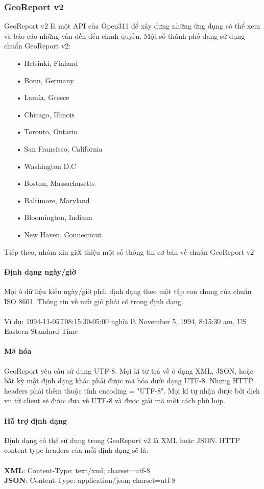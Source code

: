 \documentclass[a4paper]{article}
\begin{document}
\subsubsection{GeoReport v2}
GeoReport v2 là một API của Open311 để xây dựng những ứng dụng có thể xem và báo cáo những vấn đền đến chính quyền.
Một số thành phố đang sử dụng chuẩn GeoReport v2:
\begin{itemize}
    \item[•]Helsinki, Finland
	\item[•]Bonn, Germany
	\item[•]Lamía, Greece
	\item[•]Chicago, Illinois
	\item[•]Toronto, Ontario
	\item[•]San Francisco, California
	\item[•]Washington D.C
	\item[•]Boston, Massachusetts
	\item[•]Baltimore, Maryland
	\item[•]Bloomington, Indiana
	\item[•]New Haven, Connecticut
\end{itemize}
Tiếp theo, nhóm xin giới thiệu một số thông tin cơ bản về chuẩn GeoReport v2
\paragraph*{Định dạng ngày/giờ}
Mọi ô dữ liệu kiểu ngày/giờ phải định dạng theo một tập con chung của chuẩn ISO 8601. Thông tin về múi giờ phải có trong định dạng.\\
\\
Ví dụ: 1994-11-05T08:15:30-05:00 nghĩa là  November 5, 1994, 8:15:30 am, US Eastern Standard Time

\paragraph*{Mã hóa}
GeoReport yêu cầu sử dụng UTF-8. Mọi kí tự trả về ở dạng XML, JSON, hoặc bất kỳ một định dạng khác phải được mã hóa dưới dạng UTF-8. Những HTTP headers phải thêm thuộc tính encoding = "UTF-8". Mọi kí tự nhận được bởi dịch vụ từ client sẽ được đưa về UTF-8 và được giải mã một cách phù hợp. 
\paragraph*{Hỗ trợ định dạng}
Định dạng có thể sử dụng trong GeoReport v2 là XML hoặc JSON.
HTTP content-type headers của mỗi định dạng sẽ là: \\
\\
\textbf{XML}: Content-Type: text/xml; charset=utf-8\\
\textbf{JSON}: Content-Type: application/json; charset=utf-8
\end{document}
